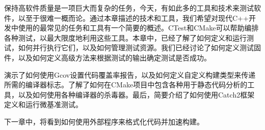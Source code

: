 保持高软件质量是一项巨大而复杂的任务，今天，有如此多的工具和技术来测试软件，以至于很难一概而论。通过本章描述的技术和工具，我们希望对现代C++开发中使用的最常见的任务和工具有一个简要的概述。CTest和CMake可以帮助编排各种测试，以最大限度地利用这些工具。本章中，已经了解了如何定义和运行测试，如何并行执行它们，以及如何管理测试资源。我们已经讨论了如何定义测试固件，以及如何定义高级方法来根据测试的输出确定测试是否成功。

演示了如何使用Gcov设置代码覆盖率报告，以及如何定义自定义构建类型来传递所需的编译器标志。了解了如何在CMake项目中包含各种用于静态代码分析的工具，以及如何使用各种编译器的杀毒器。最后，简要介绍了如何使用Catch2框架定义和运行微基准测试。

下一章中，将看到如何使用外部程序来格式化代码并加速构建。